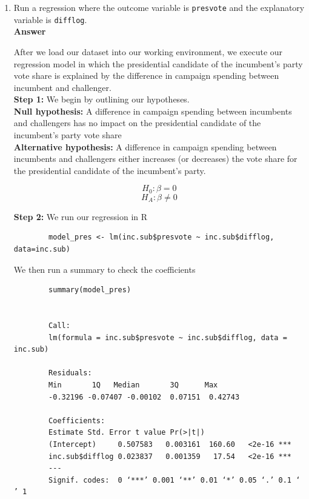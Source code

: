 \documentclass[12pt,letterpaper]{article}
\begin{document}
	\begin{enumerate}
		\item Run a regression where the outcome variable is \texttt{presvote} and the explanatory variable is \texttt{difflog}. \\
		
		\noindent 
		\textbf{Answer}
		
		After we load our dataset into our working environment, we execute our regression
		model in which the presidential candidate of the incumbent's party vote share is explained by the difference in campaign spending between incumbent and challenger. \\
		
		
		
		\textbf{Step 1:} We begin by outlining our hypotheses. \\
		
		\textbf{Null hypothesis: }
		A difference in campaign spending between incumbents and challengers has no impact on the presidential candidate of the incumbent's party vote share \\
		
		\textbf{Alternative hypothesis: }
		A difference in campaign spending between incumbents and challengers either increases (or decreases) the vote share for the presidential candidate of the incumbent's party.
		
		$$H_0: \beta = 0$$
		$$H_A: \beta \neq 0$$
		
		\vspace{.25cm}
		
		
		\textbf{Step 2:} We run our regression in R
		
		\begin{verbatim}
		model_pres <- lm(inc.sub$presvote ~ inc.sub$difflog, data=inc.sub)

		\end{verbatim}
		
		We then run a summary to check the coefficients
		
		\begin{verbatim}
		summary(model_pres)

			
		Call:
		lm(formula = inc.sub$presvote ~ inc.sub$difflog, data = inc.sub)
		
		Residuals:
		Min       1Q   Median       3Q      Max 
		-0.32196 -0.07407 -0.00102  0.07151  0.42743 
		
		Coefficients:
		Estimate Std. Error t value Pr(>|t|)    
		(Intercept)     0.507583   0.003161  160.60   <2e-16 ***
		inc.sub$difflog 0.023837   0.001359   17.54   <2e-16 ***
		---
		Signif. codes:  0 ‘***’ 0.001 ‘**’ 0.01 ‘*’ 0.05 ‘.’ 0.1 ‘ ’ 1
		

\end{verbatim}
\end{enumerate}
\end{document}
